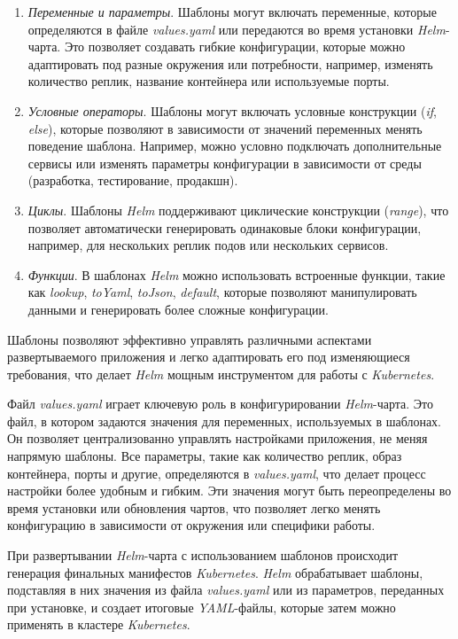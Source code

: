 \begin{enumerate}
    \item \textit{Переменные и параметры}. Шаблоны могут включать переменные, которые определяются в файле \textit{values.yaml} или передаются во время установки \textit{Helm}-чарта. Это позволяет создавать гибкие конфигурации, которые можно адаптировать под разные окружения или потребности, например, изменять количество реплик, название контейнера или используемые порты.
    \item \textit{Условные операторы}. Шаблоны могут включать условные конструкции (\textit{if}, \textit{else}), которые позволяют в зависимости от значений переменных менять поведение шаблона. Например, можно условно подключать дополнительные сервисы или изменять параметры конфигурации в зависимости от среды (разработка, тестирование, продакшн).
    \item \textit{Циклы}. Шаблоны \textit{Helm} поддерживают циклические конструкции (\textit{range}), что позволяет автоматически генерировать одинаковые блоки конфигурации, например, для нескольких реплик подов или нескольких сервисов.
    \item \textit{Функции}. В шаблонах \textit{Helm} можно использовать встроенные функции, такие как \textit{lookup}, \textit{toYaml}, \textit{toJson}, \textit{default}, которые позволяют манипулировать данными и генерировать более сложные конфигурации.
\end{enumerate}

Шаблоны позволяют эффективно управлять различными аспектами развертываемого приложения и легко адаптировать его под изменяющиеся требования, что делает \textit{Helm} мощным инструментом для работы с \textit{Kubernetes}.

Файл \textit{values.yaml} играет ключевую роль в конфигурировании \textit{Helm}-чарта. Это файл, в котором задаются значения для переменных, используемых в шаблонах. Он позволяет централизованно управлять настройками приложения, не меняя напрямую шаблоны. Все параметры, такие как количество реплик, образ контейнера, порты и другие, определяются в \textit{values.yaml}, что делает процесс настройки более удобным и гибким. Эти значения могут быть переопределены во время установки или обновления чартов, что позволяет легко менять конфигурацию в зависимости от окружения или специфики работы.

При развертывании \textit{Helm}-чарта с использованием шаблонов происходит генерация финальных манифестов \textit{Kubernetes}. \textit{Helm} обрабатывает шаблоны, подставляя в них значения из файла \textit{values.yaml} или из параметров, переданных при установке, и создает итоговые \textit{YAML}-файлы, которые затем можно применять в кластере \textit{Kubernetes}.

